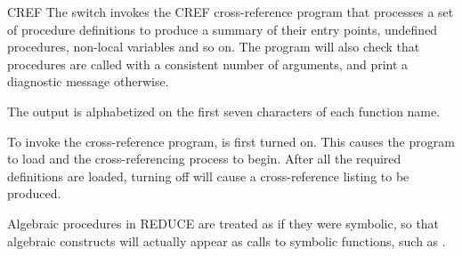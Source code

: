 \begin{Switch}{CREF}
The switch  invokes the CREF cross-reference program that
processes a set of procedure definitions to produce a summary of their
entry points, undefined procedures, non-local variables and so on.  The
program will also check that procedures are called with a consistent
number of arguments, and print a diagnostic message otherwise.

The output is alphabetized on the first seven characters of each function
name.

To invoke the cross-reference program,  is first turned on.
This causes the program to load and the cross-referencing process to
begin.  After all the required definitions are loaded, turning 
off will cause a cross-reference listing to be produced.

\begin{Comments}

Algebraic procedures in REDUCE are treated as if they were symbolic, so
that algebraic constructs will actually appear as calls to symbolic
functions, such as .
\end{Comments}

\end{Switch}


